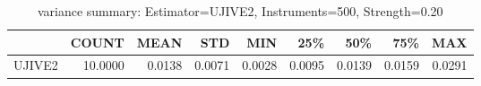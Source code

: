 \begin{table}[ht]
\centering
\caption{variance summary: Estimator=UJIVE2, Instruments=500, Strength=0.20}
\begin{tabular}{lrrrrrrrr}
\toprule
 & COUNT & MEAN & STD & MIN & 25\% & 50\% & 75\% & MAX \\
\midrule
UJIVE2 & 10.0000 & 0.0138 & 0.0071 & 0.0028 & 0.0095 & 0.0139 & 0.0159 & 0.0291 \\
\bottomrule
\end{tabular}
\end{table}
